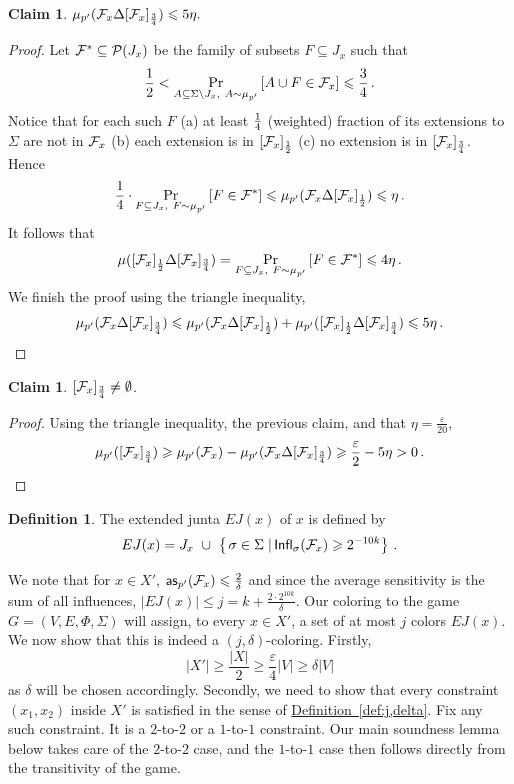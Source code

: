 \documentclass[11pt]{article}
\numberwithin{equation}{section}
\newtheorem{claim}[theorem]{Claim}
\theoremstyle{definition}
\newtheorem{definition}[theorem]{Definition}
\theoremstyle{plain}
\newcommand{\expref}[2]{\hyperref[#2]{#1~\ref{#2}}}
\newcommand\sett[2]{\left\{ \left. #1 \;\right\vert #2 \right\}}
\newcommand\Prob[2]{{\Pr_{#1}\left[ {#2} \right]}}
\newcommand\half{{1\over2}}
\newcommand\quarter{{1\over4}}
\newcommand\eps{\varepsilon}
\renewcommand\geq{\geqslant}
\renewcommand\leq{\leqslant}
\begin{document}
\begin{claim}$
\mu_{p'}({\cal F}_x \Delta [ {\cal F}_x ]_{\frac{3}{4}}   )\leqslant 5\eta.
$
\end{claim}
\begin{proof}
Let ${\cal F}^* \subseteq {\cal P}(J_x)$ be the family of subsets $F \subseteq J_x$ such that
\[
\half<\Prob{A \subseteq \Sigma\setminus J_x, ~A\sim \mu_{p'}}{A\cup F \in {\cal F}_x}\leqslant \frac{3}{4}\,.%
\]
Notice that for each such $F$  (a) at least  $\quarter$ (weighted) fraction of its extensions to $\Sigma$ are not in ${\cal F}_x$  (b)
each extension is in $[{\cal F}_x]_\half$ (c) no extension is in $[{\cal F}_x]_{\frac{3}{4}}$. Hence
\[
\quarter\cdot \Prob{F \subseteq J_x, ~F\sim\mu_{p'}}
{F \in {\cal F}^*}\leqslant
\mu_{p'}({\cal F}_x\Delta [{\cal F}_x]_\half)
\leqslant
\eta\,.%
\]
It follows that
\[
\mu([{\cal F}_x]_\frac{1}{2}\Delta [{\cal F}_x]_\frac{3}{4})
=
\Prob{F\subseteq J_x, ~F\sim\mu_{p'}}
{F \in {\cal F}^*} \leqslant 4\eta\,.%
\]
We finish the proof using the triangle inequality,
\[
\mu_{p'}({\cal F}_x\Delta [{\cal F}_x]_{\frac{3}{4}})
\leqslant
\mu_{p'}({\cal F}_x\Delta [{\cal F}_x]_{\frac{1}{2}})
+\mu_{p'}([{\cal F}_x]_\frac{1}{2}\Delta [{\cal F}_x]_\frac{3}{4})
\leqslant 5\eta\,.    \qedhere%
\]
\end{proof}

\begin{claim}\label{claim:inf_non_empty}
 $[{\cal F}_x]_{\frac{3}{4}}\neq \emptyset$.
\end{claim}
\begin{proof}
Using the triangle inequality, the previous claim, and that $\eta = \frac{\eps}{20}$,
\[
\mu_{p'}([{\cal F}_x]_{\frac{3}{4}}) \geqslant
\mu_{p'}({\cal F}_x)-\mu_{p'}({\cal F}_x \Delta [ {\cal F}_x ]_{\frac{3}{4}}   )
 \geqslant \frac{\eps}{2} - 5\eta
> 0\,.      \qedhere%
\]
\end{proof}

\begin{definition}
The extended junta $EJ(x)$ of $x$ is defined by
\[
EJ(x)= J_x ~\cup  ~\sett{\sigma \in \Sigma}{ {\sf Infl}_\sigma({\cal F}_x)\geqslant 2^{-10 k}}\,.%
\]
\end{definition}

We note that for $x \in X'$, ${\sf as}_{p'}({\cal F}_x)\leqslant \frac{2}{\delta}$ and since the average sensitivity is the sum of all influences,
$ |EJ(x)| \leq j = k +  \frac{2 \cdot 2^{10k} }{\delta}$. Our coloring to the game $G=(V,E,\Phi,\Sigma)$ will assign, to
every $x \in X'$, a set of at most $j$ colors $EJ(x)$. We now show that this is indeed a $(j,\delta)$-coloring. Firstly,
 $$|X'| \geq \frac{|X|}{2} \geq \frac{\eps}{4} |V|\geq \delta |V|$$
  as $\delta$ will be chosen accordingly. Secondly, we need
 to show that every constraint $(x_1, x_2)$ inside $X'$ is satisfied in the sense of \expref{Definition}{def:j,delta}.
 Fix any such constraint. It is a $2$-to-$2$ or a $1$-to-$1$ constraint. Our main
soundness lemma below takes care of the $2$-to-$2$ case, and the $1$-to-$1$ case then follows directly from the
transitivity of the game.
\end{document}
